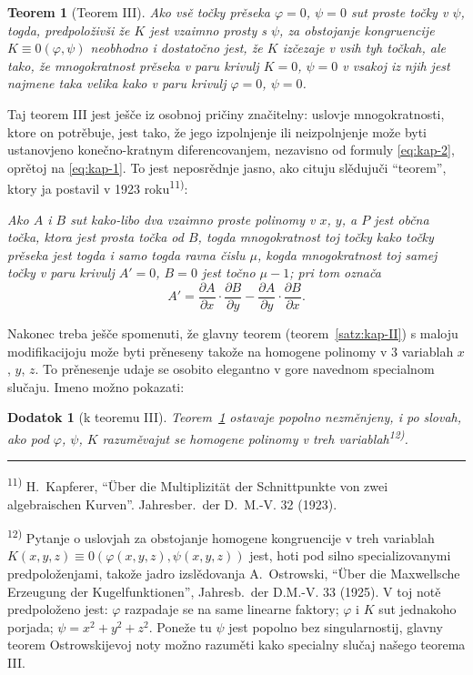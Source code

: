 \documentclass[11pt]{article}
\newcommand{\foreign}[1]{#1}
\theoremstyle{plain}
\newtheorem{satz}{Teorem}
\newtheorem{zusatz}{Dodatok}
\begin{document}
\begin{satz}[Teorem III]\label{satz:kap-III}
Ako vsě točky prěseka $\varphi = 0$, $\psi = 0$ sut proste točky v
$\psi$, togda, predpoloživši že $K$ jest vzaimno prosty s $\psi$,
za obstojanje kongruencije $K \equiv 0(\varphi, \psi)$ neobhodno i
dostatočno jest, že $K$ izčezaje v vsih tyh točkah, ale tako, že
mnogokratnost prěseka v paru krivulj $K = 0$, $\psi = 0$ v vsakoj
iz njih jest najmene taka velika kako v paru krivulj
$\varphi = 0$, $\psi = 0$.
\end{satz}

Taj teorem III jest ješče iz osobnoj pričiny značitelny: uslovje
mnogokratnosti, ktore on potrěbuje, jest tako, že jego izpolnjenje
ili neizpolnjenje može byti ustanovjeno konečno-kratnym
diferencovanjem, nezavisno od formuly \eqref{eq:kap-2}, oprětoj na
\eqref{eq:kap-1}. To jest neposrědnje jasno, ako cituju slědujuči
``teorem'', ktory ja postavil v 1923 roku\textsuperscript{11)}:

\smallskip
\textit{Ako $A$ i $B$ sut kako-libo dva vzaimno proste polinomy v
$x$, $y$, a $P$ jest občna točka, ktora jest prosta točka od $B$,
togda mnogokratnost toj točky kako točky prěseka jest togda i samo
togda ravna čislu $\mu$, kogda mnogokratnost toj samej točky v paru
krivulj $A' = 0$, $B = 0$ jest točno $\mu - 1$; pri tom označa}
\[
A' = \frac{\partial A}{\partial x} \cdot \frac{\partial B}{\partial y} -
\frac{\partial A}{\partial y} \cdot \frac{\partial B}{\partial x}.
\]

Nakonec treba ješče spomenuti, že glavny teorem
(teorem~\ref{satz:kap-II}) s maloju modifikacijoju može byti
prěneseny takože na homogene polinomy v 3 variablah $x$, $y$, $z$.
To prěnesenje udaje se osobito elegantno v gore navednom specialnom
slučaju. Imeno možno pokazati:

\begin{zusatz}[k teoremu III]
Teorem~\ref{satz:kap-III} ostavaje popolno nezměnjeny, i po slovah,
ako pod $\varphi$, $\psi$, $K$ razuměvajut se homogene polinomy v
treh variablah\textsuperscript{12)}.
\end{zusatz}

\vspace{0.5em}
\noindent\rule{\textwidth}{0.4pt}
\vspace{0.3em}

{\footnotesize
\textsuperscript{11)} H.\ Kapferer, ``Über die Multiplizität der Schnittpunkte von zwei algebraischen
Kurven''. \foreign{Jahresber.\ der D.\ M.-V.} 32 (1923).

\textsuperscript{12)} Pytanje o uslovjah za obstojanje homogene kongruencije v
treh variablah $K(x,y,z) \equiv 0(\varphi(x,y,z), \psi(x,y,z))$ jest,
hoti pod silno specializovanymi predpoloženjami, takože jadro
izslědovanja A.\ Ostrowski, ``Über die Maxwellsche Erzeugung der
Kugelfunktionen'', \foreign{Jahresb.\ der D.M.-V.} 33 (1925). V toj
notě predpoloženo jest: $\varphi$ razpadaje se na same linearne
faktory; $\varphi$ i $K$ sut jednakoho porjada; $\psi = x^{2} + y^{2} + z^{2}$.
Poneže tu $\psi$ jest popolno bez singularnostij, glavny teorem
Ostrowskijevoj noty možno razuměti kako specialny slučaj našego
teorema III.
}
\end{document}
